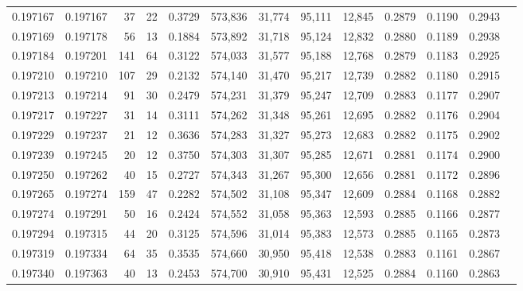 \begin{tabular}{rrrrrrrrrrrrr}
0.197167 & 0.197167 &    37 &  22 &                                     0.3729 & 573,836 &  31,774 &  95,111 &  12,845 & 0.2879 & 0.1190 & 0.2943 \\
0.197169 & 0.197178 &    56 &  13 &                                     0.1884 & 573,892 &  31,718 &  95,124 &  12,832 & 0.2880 & 0.1189 & 0.2938 \\
0.197184 & 0.197201 &   141 &  64 &                                     0.3122 & 574,033 &  31,577 &  95,188 &  12,768 & 0.2879 & 0.1183 & 0.2925 \\
0.197210 & 0.197210 &   107 &  29 &                                     0.2132 & 574,140 &  31,470 &  95,217 &  12,739 & 0.2882 & 0.1180 & 0.2915 \\
0.197213 & 0.197214 &    91 &  30 &                                     0.2479 & 574,231 &  31,379 &  95,247 &  12,709 & 0.2883 & 0.1177 & 0.2907 \\
0.197217 & 0.197227 &    31 &  14 &                                     0.3111 & 574,262 &  31,348 &  95,261 &  12,695 & 0.2882 & 0.1176 & 0.2904 \\
0.197229 & 0.197237 &    21 &  12 &                                     0.3636 & 574,283 &  31,327 &  95,273 &  12,683 & 0.2882 & 0.1175 & 0.2902 \\
0.197239 & 0.197245 &    20 &  12 &                                     0.3750 & 574,303 &  31,307 &  95,285 &  12,671 & 0.2881 & 0.1174 & 0.2900 \\
0.197250 & 0.197262 &    40 &  15 &                                     0.2727 & 574,343 &  31,267 &  95,300 &  12,656 & 0.2881 & 0.1172 & 0.2896 \\
0.197265 & 0.197274 &   159 &  47 &                                     0.2282 & 574,502 &  31,108 &  95,347 &  12,609 & 0.2884 & 0.1168 & 0.2882 \\
0.197274 & 0.197291 &    50 &  16 &                                     0.2424 & 574,552 &  31,058 &  95,363 &  12,593 & 0.2885 & 0.1166 & 0.2877 \\
0.197294 & 0.197315 &    44 &  20 &                                     0.3125 & 574,596 &  31,014 &  95,383 &  12,573 & 0.2885 & 0.1165 & 0.2873 \\
0.197319 & 0.197334 &    64 &  35 &                                     0.3535 & 574,660 &  30,950 &  95,418 &  12,538 & 0.2883 & 0.1161 & 0.2867 \\
0.197340 & 0.197363 &    40 &  13 &                                     0.2453 & 574,700 &  30,910 &  95,431 &  12,525 & 0.2884 & 0.1160 & 0.2863 \\

\end{tabular}
